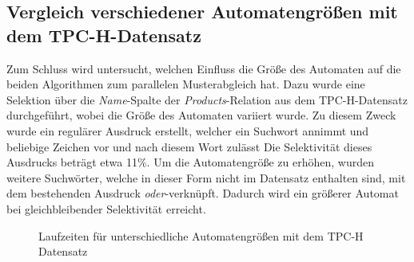 \subsection{Vergleich verschiedener Automatengrößen mit dem TPC-H-Datensatz}
\label{sec:regex_evaluation_beobachtung_5}

Zum Schluss wird untersucht, welchen Einfluss die Größe des Automaten auf die beiden Algorithmen zum parallelen Musterabgleich hat.
Dazu wurde eine Selektion über die \emph{Name}-Spalte der \emph{Products}-Relation aus dem TPC-H-Datensatz durchgeführt, wobei die Größe des Automaten variiert wurde.
Zu diesem Zweck wurde ein regulärer Ausdruck erstellt, welcher ein Suchwort annimmt und beliebige Zeichen vor und nach diesem Wort zulässt
Die Selektivität dieses Ausdrucks beträgt etwa 11\%.
Um die Automatengröße zu erhöhen, wurden weitere Suchwörter, welche in dieser Form nicht im Datensatz enthalten sind, mit dem bestehenden Ausdruck \emph{oder}-verknüpft.
Dadurch wird ein größerer Automat bei gleichbleibender Selektivität erreicht.


\begin{figure}[ht]
	\centering
	\caption{Laufzeiten für unterschiedliche Automatengrößen mit dem TPC-H Datensatz}
	\label{fig:regex_p_name}
\end{figure}

